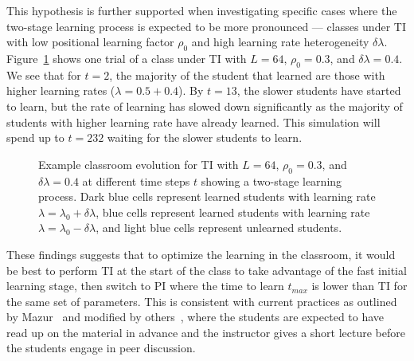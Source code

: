 \documentclass[twocolumn,secnumarabic,amssymb, nobibnotes, aps, prd]{revtex4-2}
\begin{document}
        This hypothesis is further supported when investigating specific cases where the two-stage learning process is expected to be more pronounced --- classes under TI with low positional learning factor $\rho_0$ and high learning rate heterogeneity $\delta\lambda$.
        Figure~\ref{fig:two stage learning} shows one trial of a class under TI with $L=64$, $\rho_0=0.3$, and $\delta\lambda=0.4$.
        We see that for $t=2$, the majority of the student that learned are those with higher learning rates ($\lambda=0.5+0.4$).
        By $t=13$, the slower students have started to learn, but the rate of learning has slowed down significantly as the majority of students with higher learning rate have already learned.
        This simulation will spend up to $t=232$ waiting for the slower students to learn.

    \begin{figure}[htbp!]
        \centering
        \caption{Example classroom evolution for TI with $L=64$, $\rho_0=0.3$, and $\delta\lambda=0.4$ at different time steps $t$ showing a two-stage learning process.
        Dark blue cells represent learned students with learning rate $\lambda=\lambda_0+\delta\lambda$, blue cells represent learned students with learning rate $\lambda=\lambda_0-\delta\lambda$, and light blue cells represent unlearned students.}
        \label{fig:two stage learning}
    \end{figure}

    These findings suggests that to optimize the learning in the classroom, it would be best to perform TI at the start of the class to take advantage of the fast initial learning stage, then switch to PI where the time to learn $t_{max}$ is lower than TI for the same set of parameters.
    This is consistent with current practices as outlined by Mazur~\cite{mazur1997peer} and modified by others~\cite{smith2009peer,roxas2010seating,lasry2008peer}, where the students are expected to have read up on the material in advance and the instructor gives a short lecture before the students engage in peer discussion.
\end{document}
